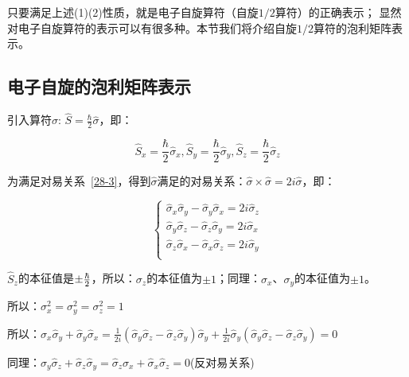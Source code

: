 只要满足上述(1)(2)性质，就是电子自旋算符（自旋$1/2$算符）的正确表示；
显然对电子自旋算符的表示可以有很多种。本节我们将介绍自旋$1/2$算符的泡利矩阵表示。


\subsection{电子自旋的泡利矩阵表示}

引入算符$\hat \sigma$: $\widehat S = \frac{\hbar }{2}\widehat\sigma $，即：

\begin{equation}\label{28-4}
\widehat S_x  = \frac{\hbar }{2}\widehat\sigma _x , \widehat S_y  = \frac{\hbar }{2}\widehat\sigma _y, \widehat S_z  = \frac{\hbar }{2}\widehat\sigma _z
\end{equation}

为满足对易关系~\ref{28-3}，得到$\hat \sigma$满足的对易关系：$\widehat\sigma  \times \widehat\sigma  = 2i\widehat\sigma $，即：


\begin{equation}\label{28-5}
\left\{ \begin{array}{l}
 \widehat\sigma _x \widehat\sigma _y  - \widehat\sigma _y \widehat\sigma _x  = 2i\widehat\sigma _z  \\
 \widehat\sigma _y \widehat\sigma _z  - \widehat\sigma _z \widehat\sigma _y  = 2i\widehat\sigma _x  \\
 \widehat\sigma _z \widehat\sigma _x  - \widehat\sigma _x \widehat\sigma _z  = 2i\widehat\sigma _y  \\
 \end{array} \right.
\end{equation}


$\hat S_z$的本征值是$ \pm {\textstyle{\hbar  \over 2}}$，所以：$\sigma_z$的本征值为$ \pm 1$；同理：$\sigma_x$、$\sigma_y$的本征值为$\pm 1$。

所以：$\sigma _x^2  = \sigma _y^2  = \sigma _z^2  = 1$

所以：$\widehat\sigma _x \widehat\sigma _y  + \widehat\sigma _y \widehat\sigma _x  = \frac{1}{{2i}}\left( {\widehat\sigma _y \widehat\sigma _z  - \widehat\sigma _z \widehat\sigma _y } \right)\widehat\sigma _y  + \frac{1}{{2i}}\widehat\sigma _y \left( {\widehat\sigma _y \widehat\sigma _z  - \widehat\sigma _z \widehat\sigma _y } \right) = 0$


同理：$\widehat\sigma _y \widehat\sigma _z  + \widehat\sigma _z \widehat\sigma _y  = \widehat\sigma _z \widehat\sigma _x  + \widehat\sigma _x \widehat\sigma _z  = 0$(反对易关系)

